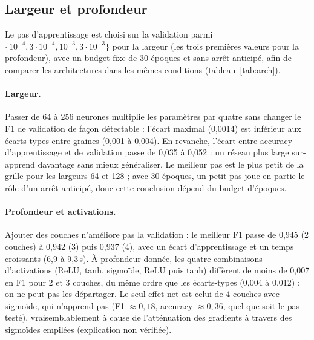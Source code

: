 \documentclass[10pt,a4paper]{article}
\begin{document}
\subsection{Largeur et profondeur}    %
Le pas d'apprentissage est choisi sur la validation parmi $\{10^{-4},3\!\cdot\!10^{-4},10^{-3},3\!\cdot\!10^{-3}\}$
pour la largeur (les trois premières valeurs pour la profondeur), avec un budget fixe de 30 époques et sans
arrêt anticipé, afin de comparer les architectures dans les mêmes conditions (tableau~\ref{tab:arch}).

\paragraph{Largeur.} Passer de 64 à 256 neurones multiplie les paramètres par quatre sans changer
le F1 de validation de façon détectable : l'écart maximal (0,0014) est inférieur aux écarts-types entre graines
(0,001 à 0,004). En revanche, l'écart entre accuracy d'apprentissage et de validation passe de 0,035 à 0,052 :
un réseau plus large sur-apprend davantage sans mieux généraliser. Le meilleur pas est le plus petit de la grille
pour les largeurs 64 et 128 ; avec 30 époques, un petit pas joue en partie le rôle d'un arrêt anticipé, donc
cette conclusion dépend du budget d'époques.

\paragraph{Profondeur et activations.} Ajouter des couches n'améliore pas la validation : le meilleur F1
passe de 0,945 (2 couches) à 0,942 (3) puis 0,937 (4), avec un écart d'apprentissage et un temps croissants
(6,9 à 9,3\,s). À profondeur donnée, les quatre combinaisons d'activations (ReLU, tanh, sigmoïde, ReLU puis
tanh) diffèrent de moins de 0,007 en F1 pour 2 et 3 couches, du même ordre que les écarts-types (0,004 à 0,012) :
on ne peut pas les départager. Le seul effet net est celui de 4 couches avec sigmoïde, qui n'apprend pas
(F1 $\approx 0{,}18$, accuracy $\approx 0{,}36$, quel que soit le pas testé), vraisemblablement à cause de
l'atténuation des gradients à travers des sigmoïdes empilées (explication non vérifiée).
\end{document}
